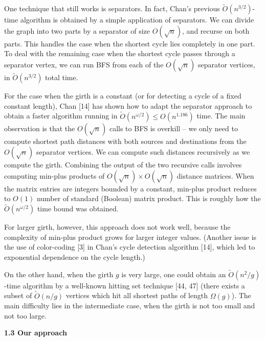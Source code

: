 One technique that still works is separators. In fact, Chan’s previous $\widetilde{O}(n^{3/2})$-time algorithm is obtained by a simple application of separators. We can divide the graph into two parts by a separator of size $O(\sqrt{n})$, and recurse on both parts. This handles the case when the shortest cycle lies completely in one part. To deal with the remaining case when the shortest cycle passes through a separator vertex, we can run BFS from each of the $O(\sqrt{n})$ separator vertices, in $\widetilde{O}(n^{3/2})$ total time.
\par
\par
For the case when the girth is a constant (or for detecting a cycle of a fixed constant length), Chan [14] has shown how to adapt the separator approach to obtain a faster algorithm running in $\widetilde{O}(n^{\omega/2})\leq O(n^{1.186})$ time. The main observation is that the $O(\sqrt{n})$ calls to BFS is overkill – we only need to compute shortest path distances with both sources and destinations from the $O(\sqrt{n})$ separator vertices. We can compute such distances recursively as we compute the girth. Combining the output of the two recursive calls involves computing min-plus products of $O(\sqrt{n})\times O(\sqrt{n})$ distance matrices. When the matrix entries are integers bounded by a constant, min-plus product reduces to $O(1)$ number of standard (Boolean) matrix product. This is roughly how the $\widetilde{O}(n^{\omega/2})$ time bound was obtained.
\par
\par
For larger girth, however, this approach does not work well, because the complexity of min-plus product grows for larger integer values. (Another issue is the use of color-coding [3] in Chan’s cycle detection algorithm [14], which led to exponential dependence on the cycle length.)
\par
\par
On the other hand, when the girth $g$ is very large, one could obtain an $\widetilde{O}(n^{2}/g)$-time algorithm by a well-known hitting set technique [44, 47] (there exists a subset of $\widetilde{O}(n/g)$ vertices which hit all shortest paths of length $\Omega(g)$). The main difficulty lies in the intermediate case, when the girth is not too small and not too large.
\par
\par
\par\medskip\noindent\textbf{1.3 Our approach}\par

